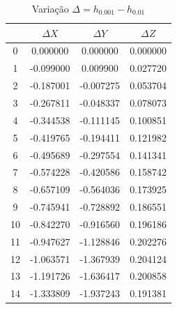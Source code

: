 \documentclass[12pt, a4paper]{article}
\begin{document}
\begin{table}[H]
    \centering
    \footnotesize
    \begin{tabular}{|c|c|c|c|}
    \toprule
     & $\Delta X$ & $\Delta Y$ & $\Delta Z$ \\
    \midrule
    0 & 0.000000 & 0.000000 & 0.000000 \\
    1 & -0.099000 & 0.009900 & 0.027720 \\
    2 & -0.187001 & -0.007275 & 0.053704 \\
    3 & -0.267811 & -0.048337 & 0.078073 \\
    4 & -0.344538 & -0.111145 & 0.100851 \\
    5 & -0.419765 & -0.194411 & 0.121982 \\
    6 & -0.495689 & -0.297554 & 0.141341 \\
    7 & -0.574228 & -0.420586 & 0.158742 \\
    8 & -0.657109 & -0.564036 & 0.173925 \\
    9 & -0.745941 & -0.728892 & 0.186551 \\
    10 & -0.842270 & -0.916560 & 0.196186 \\
    11 & -0.947627 & -1.128846 & 0.202276 \\
    12 & -1.063571 & -1.367939 & 0.204124 \\
    13 & -1.191726 & -1.636417 & 0.200858 \\
    14 & -1.333809 & -1.937243 & 0.191381 \\
    \bottomrule
    \end{tabular}
    \caption{Variação $\Delta = h_{0.001} - h_{0.01}$}
\end{table}
\end{document}
